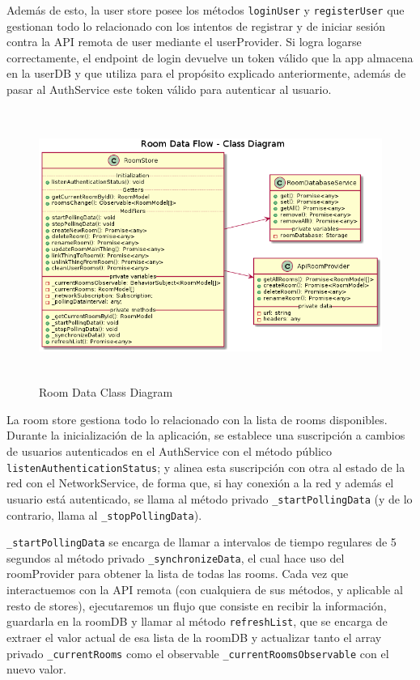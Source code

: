 \vspace{0.5cm}

Además de esto, la user store posee los métodos \verb|loginUser| y \verb|registerUser| que gestionan todo lo relacionado con los intentos de registrar y de iniciar sesión contra la API remota de user mediante el userProvider. Si logra logarse correctamente, el endpoint de login devuelve un token válido que la app almacena en la userDB y que utiliza para el propósito explicado anteriormente, además de pasar al AuthService este token válido para autenticar al usuario.

\begin{figure}[hbt!]
\centering
\includegraphics[height=3.5in]{figures/diagrams/front/data-flow/room.png}
\caption[room]{Room Data Class Diagram\footnotemark}
\end{figure}

\vspace{1cm}

La room store gestiona todo lo relacionado con la lista de rooms disponibles. Durante la inicialización de la aplicación, se establece una suscripción a cambios de usuarios autenticados en el AuthService con el método público \verb|listenAuthenticationStatus|; y alinea esta suscripción con otra al estado de la red con el NetworkService, de forma que, si hay conexión a la red y además el usuario está autenticado, se llama al método privado \verb|_startPollingData| (y de lo contrario, llama al \verb|_stopPollingData|).

\vspace{0.5cm}

\verb|_startPollingData| se encarga de llamar a intervalos de tiempo regulares de 5 segundos al método privado \verb|_synchronizeData|, el cual hace uso del roomProvider para obtener la lista de todas las rooms. Cada vez que interactuemos con la API remota (con cualquiera de sus métodos, y aplicable al resto de stores), ejecutaremos un flujo que consiste en recibir la información, guardarla en la roomDB y llamar al método \verb|refreshList|, que se encarga de extraer el valor actual de esa lista de la roomDB y actualizar tanto el array privado \verb|_currentRooms| como el observable \verb|_currentRoomsObservable| con el nuevo valor.

